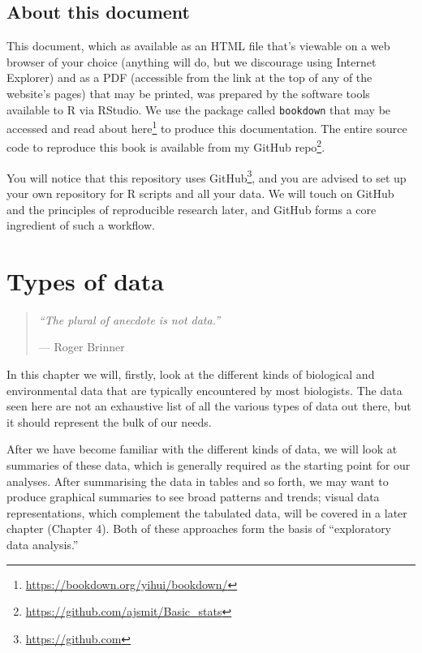\documentclass[english,10pt,a4paper,oneside]{book}
\renewcommand{\href}[2]{#2\footnote{\url{#1}}}
\let\rmarkdownfootnote\footnote%
\def\footnote{\protect\rmarkdownfootnote}
\theoremstyle{definition}
\theoremstyle{definition}
\theoremstyle{definition}
\theoremstyle{remark}
\begin{document}
\hypertarget{about-this-document}{%
\section{About this document}\label{about-this-document}}

This document, which as available as an HTML file that's viewable on a
web browser of your choice (anything will do, but we discourage using
Internet Explorer) and as a PDF (accessible from the link at the top of
any of the website's pages) that may be printed, was prepared by the
software tools available to R via RStudio. We use the package called
\texttt{bookdown} that may be accessed and read about
\href{https://bookdown.org/yihui/bookdown/}{here} to produce this
documentation. The entire source code to reproduce this book is
available from my \href{https://github.com/ajsmit/Basic_stats}{GitHub
repo}.

You will notice that this repository uses
\href{https://github.com}{GitHub}, and you are advised to set up your
own repository for R scripts and all your data. We will touch on GitHub
and the principles of reproducible research later, and GitHub forms a
core ingredient of such a workflow.

\hypertarget{types-of-data}{%
\chapter{Types of data}\label{types-of-data}}

\begin{quote}
\emph{\enquote{The plural of anecdote is not data.}}

--- Roger Brinner
\end{quote}

In this chapter we will, firstly, look at the different kinds of
biological and environmental data that are typically encountered by most
biologists. The data seen here are not an exhaustive list of all the
various types of data out there, but it should represent the bulk of our
needs.

After we have become familiar with the different kinds of data, we will
look at summaries of these data, which is generally required as the
starting point for our analyses. After summarising the data in tables
and so forth, we may want to produce graphical summaries to see broad
patterns and trends; visual data representations, which complement the
tabulated data, will be covered in a later chapter (Chapter 4). Both of
these approaches form the basis of \enquote{exploratory data analysis.}
\end{document}
